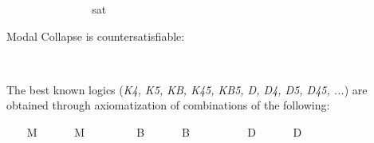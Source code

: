 \begin{isabellebody}
\ \ \ \ \ \ \ \ \ \ \ \ %
%
\endisatagproof
{\isafoldproof}%
%
\isadelimproof
%
\endisadelimproof
\isanewline
\ \isamarkupfalse%
\ {\isachardoublequoteopen}{\isasymlfloor}\isactrlbold {\isasymbox}{\isasymphi}{\isasymrfloor}\isactrlsup s\isactrlsup a\isactrlsup t\ {\isasymlongrightarrow}\ {\isasymlfloor}\isactrlbold {\isasymbox}{\isasymphi}{\isasymrfloor}{\isachardoublequoteclose}\ \isamarkupfalse%
%
\isadelimproof
\ %
\endisadelimproof
%
\isatagproof
{}\isamarkupfalse%
\ \ \ \ \ \ \ \ \ \ \ %
%
\endisatagproof
{\isafoldproof}%
%
\isadelimproof
%
\endisadelimproof
%
\begin{isamarkuptext}%
Modal Collapse is countersatisfiable:%
\end{isamarkuptext}\isamarkuptrue%
\ \isamarkupfalse%
\ {\isachardoublequoteopen}{\isasymlfloor}{\isasymphi}\ \isactrlbold {\isasymrightarrow}\ \isactrlbold {\isasymbox}{\isasymphi}{\isasymrfloor}{\isachardoublequoteclose}\ \isamarkupfalse%
%
\isadelimproof
\ %
\endisadelimproof
%
\isatagproof
{}\isamarkupfalse%
\ \ \ \ \ \ \ \ \ \ \ \ \ \ \ \ \ \ %
%
\endisatagproof
{\isafoldproof}%
%
\isadelimproof
%
\endisadelimproof
%
\isamarkuptrue%
%
\begin{isamarkuptext}%
The best known logics (\emph{K4, K5, KB, K45, KB5, D, D4, D5, D45, ...}) are obtained through
 axiomatization of combinations of the following:%
\end{isamarkuptext}\isamarkuptrue%
\ \ \isamarkupfalse%
\ M\ \isanewline
\ \ \ \ \ {\isachardoublequoteopen}M\ {\isasymequiv}\ \isactrlbold {\isasymforall}{\isasymphi}{\isachardot}\ \isactrlbold {\isasymbox}{\isasymphi}\ \isactrlbold {\isasymrightarrow}\ {\isasymphi}{\isachardoublequoteclose}\isanewline
\ \ \isamarkupfalse%
\ B\ \isanewline
\ \ \ \ \ {\isachardoublequoteopen}B\ {\isasymequiv}\ \isactrlbold {\isasymforall}{\isasymphi}{\isachardot}\ {\isasymphi}\ \isactrlbold {\isasymrightarrow}\ \ \isactrlbold {\isasymbox}\isactrlbold {\isasymdiamond}{\isasymphi}{\isachardoublequoteclose}\isanewline
\ \ \isamarkupfalse%
\ D\ \isanewline
\ \ \ \ \ {\isachardoublequoteopen}D\ {\isasymequiv}\ \isactrlbold {\isasymforall}{\isasymphi}{\isachardot}\ \isactrlbold {\isasymbox}{\isasymphi}\ \isactrlbold {\isasymrightarrow}\ \isactrlbold {\isasymdiamond}{\isasymphi}{\isachardoublequoteclose}\isanewline

\end{isabellebody}
